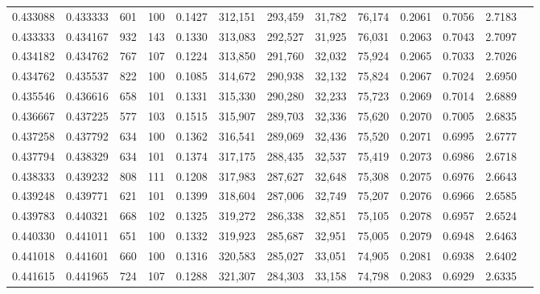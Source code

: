 \begin{tabular}{rrrrrrrrrrrrr}
0.433088 & 0.433333 &    601 &   100 &                                     0.1427 & 312,151 & 293,459 &  31,782 &  76,174 & 0.2061 & 0.7056 & 2.7183 \\
0.433333 & 0.434167 &    932 &   143 &                                     0.1330 & 313,083 & 292,527 &  31,925 &  76,031 & 0.2063 & 0.7043 & 2.7097 \\
0.434182 & 0.434762 &    767 &   107 &                                     0.1224 & 313,850 & 291,760 &  32,032 &  75,924 & 0.2065 & 0.7033 & 2.7026 \\
0.434762 & 0.435537 &    822 &   100 &                                     0.1085 & 314,672 & 290,938 &  32,132 &  75,824 & 0.2067 & 0.7024 & 2.6950 \\
0.435546 & 0.436616 &    658 &   101 &                                     0.1331 & 315,330 & 290,280 &  32,233 &  75,723 & 0.2069 & 0.7014 & 2.6889 \\
0.436667 & 0.437225 &    577 &   103 &                                     0.1515 & 315,907 & 289,703 &  32,336 &  75,620 & 0.2070 & 0.7005 & 2.6835 \\
0.437258 & 0.437792 &    634 &   100 &                                     0.1362 & 316,541 & 289,069 &  32,436 &  75,520 & 0.2071 & 0.6995 & 2.6777 \\
0.437794 & 0.438329 &    634 &   101 &                                     0.1374 & 317,175 & 288,435 &  32,537 &  75,419 & 0.2073 & 0.6986 & 2.6718 \\
0.438333 & 0.439232 &    808 &   111 &                                     0.1208 & 317,983 & 287,627 &  32,648 &  75,308 & 0.2075 & 0.6976 & 2.6643 \\
0.439248 & 0.439771 &    621 &   101 &                                     0.1399 & 318,604 & 287,006 &  32,749 &  75,207 & 0.2076 & 0.6966 & 2.6585 \\
0.439783 & 0.440321 &    668 &   102 &                                     0.1325 & 319,272 & 286,338 &  32,851 &  75,105 & 0.2078 & 0.6957 & 2.6524 \\
0.440330 & 0.441011 &    651 &   100 &                                     0.1332 & 319,923 & 285,687 &  32,951 &  75,005 & 0.2079 & 0.6948 & 2.6463 \\
0.441018 & 0.441601 &    660 &   100 &                                     0.1316 & 320,583 & 285,027 &  33,051 &  74,905 & 0.2081 & 0.6938 & 2.6402 \\
0.441615 & 0.441965 &    724 &   107 &                                     0.1288 & 321,307 & 284,303 &  33,158 &  74,798 & 0.2083 & 0.6929 & 2.6335 \\

\end{tabular}
